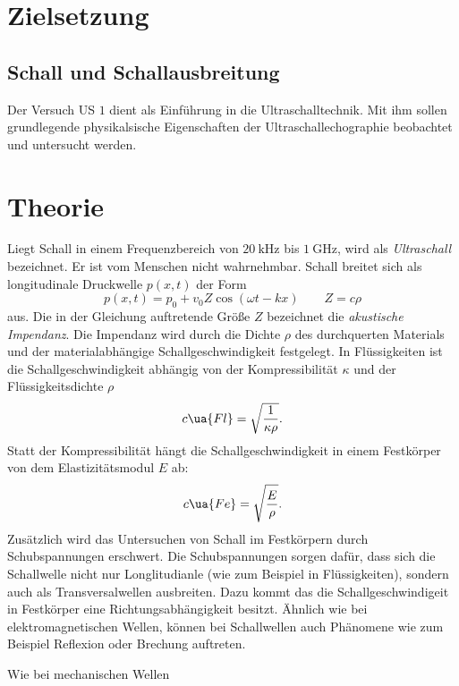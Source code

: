 \setcounter{page}{1}
\section*{Zielsetzung}

\subsection{Schall und Schallausbreitung}
Der Versuch US $1$ dient als Einführung in die Ultraschalltechnik.
Mit ihm sollen grundlegende physikalsische Eigenschaften der
Ultraschallechographie beobachtet und untersucht werden.
\section{Theorie}
Liegt Schall in einem Frequenzbereich von $\SI{20}{\kilo\hertz}$ bis $\SI{1}{\giga\hertz}$,
wird als \emph{Ultraschall} bezeichnet. Er ist vom Menschen nicht wahrnehmbar.
Schall breitet sich als longitudinale Druckwelle $p(x,t)$ der Form
\begin{equation*}
  p(x,t)=p_0+v_0 Z \cos(\omega t - kx) \qquad Z=c\rho
\end{equation*}
aus. Die in der Gleichung auftretende Größe $Z$ bezeichnet die \emph{akustische Impendanz}.
Die Impendanz wird durch die Dichte $\rho$ des durchquerten Materials und der
materialabhängige Schallgeschwindigkeit festgelegt.
In Flüssigkeiten ist die Schallgeschwindigkeit abhängig von der
Kompressibilität $\kappa$ und der Flüssigkeitsdichte $\rho$
\begin{equation*}
  c\ua{Fl}=\sqrt{\frac{1}{\kappa\rho}}.
\end{equation*}
Statt der Kompressibilität hängt die Schallgeschwindigkeit in einem Festkörper von
dem Elastizitätsmodul $E$ ab:
\begin{equation*}
  c\ua{Fe}=\sqrt{\frac{E}{\rho}}.
\end{equation*}
Zusätzlich wird das Untersuchen von Schall im Festkörpern durch Schubspannungen
erschwert. Die Schubspannungen sorgen dafür, dass sich die Schallwelle nicht nur
Longlitudianle (wie zum Beispiel in Flüssigkeiten), sondern auch als
Transversalwellen ausbreiten.
Dazu kommt das die Schallgeschwindigeit in Festkörper eine Richtungsabhängigkeit
besitzt.
Ähnlich wie bei elektromagnetischen Wellen, können bei Schallwellen auch
Phänomene wie zum Beispiel Reflexion oder Brechung auftreten.

Wie bei mechanischen Wellen 

